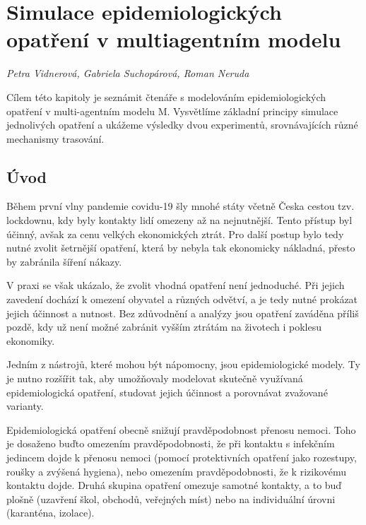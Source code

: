 
\chapter{Simulace epidemiologických opatření v multiagentním modelu}
\label{Evaluace_politik}

\textit{Petra Vidnerová, Gabriela Suchopárová, Roman Neruda}
\vspace{15mm}

Cílem této kapitoly je seznámit čtenáře s modelováním
epidemiologických opatření v multi-agentním modelu M. Vysvětlíme
základní principy simulace jednolivých opatření a ukážeme výsledky
dvou experimentů, srovnávajících různé mechanismy trasování.


\section*{Úvod}

Během první vlny pandemie covidu-19 šly mnohé státy včetně Česka
cestou tzv. lockdownu, kdy byly kontakty lidí omezeny až na
nejnutnější. Tento přístup byl účinný, avšak za cenu velkých
ekonomických ztrát. Pro další postup bylo tedy nutné zvolit šetrnější
opatření, která by nebyla tak ekonomicky nákladná, přesto by zabránila
šíření nákazy.

V praxi se však ukázalo, že zvolit vhodná opatření není
jednoduché. Při jejich zavedení dochází k omezení obyvatel a různých
odvětví, a je tedy nutné prokázat jejich účinnost a nutnost. Bez
zdůvodnění a analýzy jsou opatření zaváděna příliš pozdě, kdy už není
možné zabránit vyšším ztrátám na životech i poklesu ekonomiky.

Jedním z nástrojů, které mohou být nápomocny, jsou epidemiologické
modely.  Ty je nutno rozšířit tak, aby umožňovaly modelovat skutečně
využívaná epidemiologická opatření, studovat jejich účinnost a
porovnávat zvažované varianty.

Epidemiologická opatření obecně snižují pravděpodobnost přenosu nemoci. Toho
je dosaženo buďto omezením pravděpodobnosti, že při kontaktu s infekčním jedincem
dojde k přenosu nemoci (pomocí protektivních opatření jako rozestupy, roušky
a zvýšená hygiena), nebo omezením pravděpodobnosti, že k rizikovému kontaktu
dojde. Druhá skupina opatření omezuje samotné kontakty, a to buď plošně
(uzavření škol, obchodů, veřejných míst) nebo na individuální úrovni
(karanténa, izolace).

